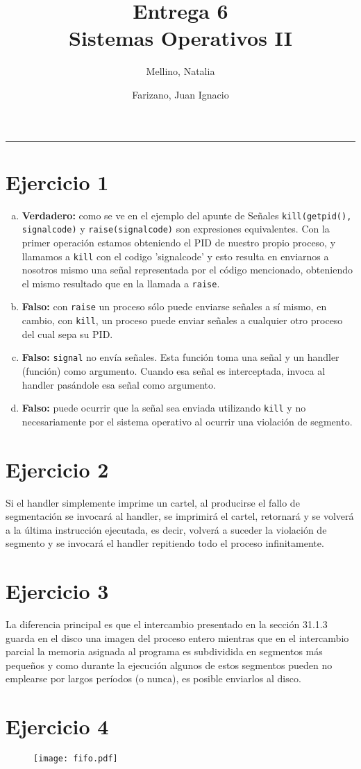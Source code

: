 \documentclass[11pt]{article}
\title{
    Entrega 6 \\
    \large Sistemas Operativos II}
\author{Mellino, Natalia \and Farizano, Juan Ignacio}
\date{}
\begin{document}
\maketitle

\noindent\rule{\textwidth}{1pt}

\section*{Ejercicio 1}

\begin{enumerate}[a)]
  \item \textbf{Verdadero:} como se ve en el ejemplo del apunte de Señales
        \texttt{kill(getpid(), signalcode)} y \texttt{raise(signalcode)} son
        expresiones equivalentes. Con la primer operación estamos obteniendo
        el PID de nuestro propio proceso, y llamamos a \texttt{kill} con el codigo
        'signalcode' y esto resulta en enviarnos a nosotros mismo una señal
        representada por el código mencionado, obteniendo el mismo resultado
        que en la llamada a \texttt{raise}.
  \item \textbf{Falso:} con \texttt{raise} un proceso sólo puede enviarse señales
        a sí mismo, en cambio, con \texttt{kill}, un proceso puede enviar señales
        a cualquier otro proceso del cual sepa su PID.
  \item \textbf{Falso:} \texttt{signal} no envía señales. Esta función toma una señal
        y un handler (función) como argumento. Cuando esa señal es interceptada, invoca
        al handler pasándole esa señal como argumento.
  \item \textbf{Falso:} puede ocurrir que la señal sea enviada utilizando \texttt{kill} y no
        necesariamente por el sistema operativo al ocurrir una violación de segmento.
\end{enumerate}

\section*{Ejercicio 2}

Si el handler simplemente imprime un cartel, al producirse el fallo de segmentación
se invocará al handler, se imprimirá el cartel, retornará y se volverá a la última
instrucción ejecutada, es decir, volverá a suceder la violación de segmento y se 
invocará el handler repitiendo todo el proceso infinitamente.

\section*{Ejercicio 3}
La diferencia principal es que el intercambio presentado en la sección 31.1.3
guarda en el disco una imagen del proceso entero mientras que en el 
intercambio parcial la memoria asignada al programa es subdividida en 
segmentos más pequeños y como durante la ejecución algunos de estos
segmentos pueden no emplearse por largos períodos (o nunca), es posible
enviarlos al disco.

\section*{Ejercicio 4}
\begin{figure}[h!]
  \begin{center}
    \texttt{[image: fifo.pdf]}
  \end{center}
\end{figure}
\end{document}
